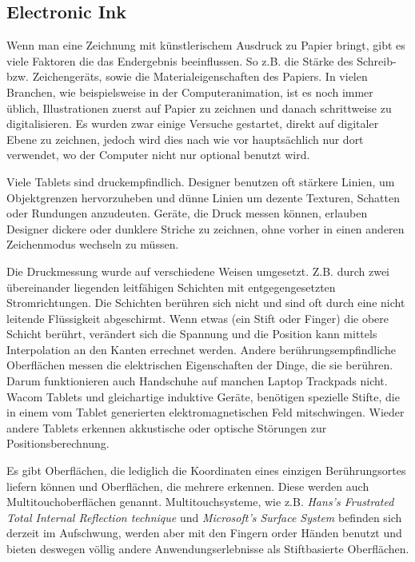 \subsection{Electronic Ink} 
Wenn man eine Zeichnung mit künstlerischem Ausdruck zu Papier bringt, gibt es viele Faktoren die das Endergebnis beeinflussen. So z.B. die Stärke des Schreib- bzw. Zeichengeräts, sowie die Materialeigenschaften des Papiers. In vielen Branchen, wie beispielsweise in der Computeranimation, ist es noch immer üblich, Illustrationen zuerst auf Papier zu zeichnen und danach schrittweise zu digitalisieren. Es wurden zwar einige Versuche gestartet, direkt auf digitaler Ebene zu zeichnen, jedoch wird dies nach wie vor hauptsächlich nur dort verwendet, wo der Computer nicht nur optional benutzt wird. \citep{Henzen:2005}

Viele Tablets sind druckempfindlich. Designer benutzen oft stärkere Linien, um Objektgrenzen hervorzuheben und dünne Linien um dezente Texturen, Schatten oder Rundungen anzudeuten. Geräte, die Druck messen können, erlauben Designer dickere oder dunklere Striche zu zeichnen, ohne vorher in einen anderen Zeichenmodus wechseln zu müssen.

Die Druckmessung wurde auf verschiedene Weisen umgesetzt. Z.B. durch zwei übereinander liegenden leitfähigen Schichten mit entgegengesetzten Stromrichtungen. Die Schichten berühren sich nicht und sind oft durch eine nicht leitende Flüssigkeit abgeschirmt. Wenn etwas (ein Stift oder Finger) die obere Schicht berührt, verändert sich die Spannung und die Position kann mittels Interpolation an den Kanten errechnet werden. Andere berührungsempfindliche Oberflächen messen die elektrischen Eigenschaften der Dinge, die sie berühren. Darum funktionieren auch Handschuhe auf manchen Laptop Trackpads nicht. Wacom\texttrademark{} Tablets und gleichartige induktive Geräte, benötigen spezielle Stifte, die in einem vom Tablet generierten elektromagnetischen Feld mitschwingen. Wieder andere Tablets erkennen akkustische oder optische Störungen zur Positionsberechnung.

Es gibt Oberflächen, die lediglich die Koordinaten eines einzigen Berührungsortes liefern können und Oberflächen, die mehrere erkennen. Diese werden auch Multitouchoberflächen genannt. Multitouchsysteme, wie z.B. \emph{Hans's Frustrated Total Internal Reflection technique} \citep{Han:2005} und \emph{Microsoft's Surface System} \citep{Surface:2010} befinden sich derzeit im Aufschwung, werden aber mit den Fingern order Händen benutzt und bieten deswegen völlig andere Anwendungserlebnisse als Stiftbasierte Oberflächen.

